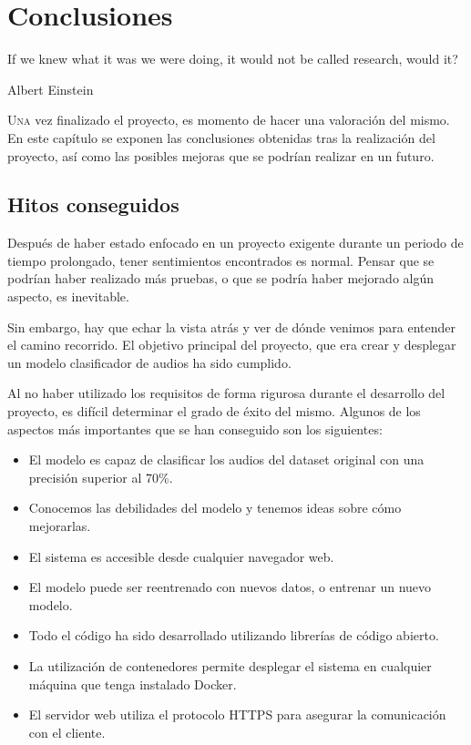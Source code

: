 \chapter{Conclusiones}\label{chp-04}

\epigraph{If we knew what it was we were doing, it would not be called research, would it?}{Albert Einstein}

\lettrine[lraise=-0.1, lines=2, loversize=0.2]{U}{na} vez finalizado el proyecto, es momento de hacer una valoración del mismo. 
En este capítulo se exponen las conclusiones obtenidas tras la realización del proyecto, así como las posibles mejoras que se podrían realizar en un futuro.

\section{Hitos conseguidos}
Después de haber estado enfocado en un proyecto exigente durante un periodo de tiempo prolongado, tener sentimientos encontrados es normal. 
Pensar que se podrían haber realizado más pruebas, o que se podría haber mejorado algún aspecto, es inevitable.

Sin embargo, hay que echar la vista atrás y ver de dónde venimos para entender el camino recorrido.
El objetivo principal del proyecto, que era crear y desplegar un modelo clasificador de audios ha sido cumplido.

Al no haber utilizado los requisitos de forma rigurosa durante el desarrollo del proyecto, es difícil determinar el grado de éxito del mismo.
Algunos de los aspectos más importantes que se han conseguido son los siguientes:

\begin{itemize}
    \item El modelo es capaz de clasificar los audios del dataset original con una precisión superior al 70\%.
    \item Conocemos las debilidades del modelo y tenemos ideas sobre cómo mejorarlas.
    \item El sistema es accesible desde cualquier navegador web.
    \item El modelo puede ser reentrenado con nuevos datos, o entrenar un nuevo modelo.
    \item Todo el código ha sido desarrollado utilizando librerías de código abierto.
    \item La utilización de contenedores permite desplegar el sistema en cualquier máquina que tenga instalado Docker.
    \item El servidor web utiliza el protocolo HTTPS para asegurar la comunicación con el cliente.
\end{itemize}

